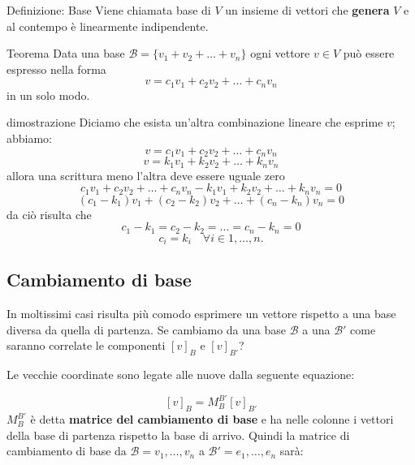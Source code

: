 \documentclass[x11names]{article}
\begin{document}
\begin{center}
\colorbox{myblue}{\begin{minipage}{5.75in}
\begin{blues}{Definizione: Base}
Viene chiamata base di $V$ un insieme di vettori che \textbf{genera} $V$ e al contempo è linearmente indipendente.
\end{blues}
\end{minipage}}        
\end{center}


\begin{center}
\colorbox{myred}{\begin{minipage}{5.75in}
\begin{redes}{Teorema}
Data una base $\mathscr{B} = \{v_1 + v_2 + \dots + v_{n}\}$ ogni vettore $v \in V$ può essere espresso nella forma
\[
v = c_1v_1 + c_2v_2 + \dots + c_{n}v_{n}
\]
in un solo modo.
\end{redes}
\end{minipage}}        
\end{center}

\begin{es}{dimostrazione}
Diciamo che esista un'altra combinazione lineare che esprime $v$; abbiamo:
\[
v = c_1v_1 + c_2v_2 + \dots + c_{n}v_{n}
\]
\[
v = k_1v_1 + k_2v_2 + \dots + k_{n}v_{n}
\]
allora una scrittura meno l'altra deve essere uguale zero
\[
c_1v_1 + c_2v_2 + \dots + c_{n}v_{n} - k_1v_1 + k_2v_2 + \dots + k_{n}v_{n} = 0
\] 
\[
	\left(c_1-k_1\right)v_1 + \left(c_2-k_2\right)v_2 + \dots + \left(c_{n} - k_{n}\right)v_{n} = 0
\] 
da ciò risulta che
\[
c_1 - k_1 = c_2 - k_2 = \dots = c_{n} -k_{n} = 0
\] 
\[
c_i = k_{i} \quad \forall i \in {1,\dots,n}
.\] 
\end{es}



\subsection{Cambiamento di base}
In moltissimi casi risulta più comodo esprimere un vettore rispetto a una base diversa da quella di partenza. Se cambiamo da una base $\mathscr{B}$ a una $\mathscr{B}'$ come saranno correlate le componenti $\left[v\right]_{B}$ e $\left[v\right]_{B'}$?

\noindent
Le vecchie coordinate sono legate alle nuove dalla seguente equazione:

\[
\left[v\right]_{B} = M_{B}^{B'} \left[v\right]_{B'}
\] 
$M_{B}^{B'}$ è detta  \textbf{matrice del cambiamento di base} e ha nelle colonne i vettori della base di partenza rispetto la base di arrivo. Quindi la matrice di cambiamento di base da $\mathscr{B} = {v_1,\dots,v_{n}}$ a $\mathscr{B}' = {e_{1},\dots,e_{n}}$ sarà:
\end{document}
